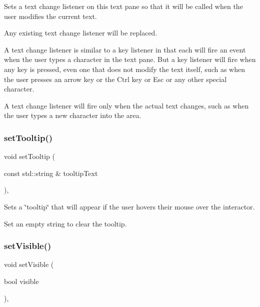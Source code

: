 Sets a text change listener on this text pane so that it will be called when the user modifies the current text. 

Any existing text change listener will be replaced.

A text change listener is similar to a key listener in that each will fire an event when the user types a character in the text pane. But a key listener will fire when any key is pressed, even one that does not modify the text itself, such as when the user presses an arrow key or the Ctrl key or Esc or any other special character.

A text change listener will fire only when the actual text changes, such as when the user types a new character into the area. \mbox{\label{classGInteractor_a039e0e49beaecc275efce02d416acea8}} 
\subsubsection{\texorpdfstring{set\+Tooltip()}{setTooltip()}}
{\footnotesize\ttfamily void set\+Tooltip (\begin{DoxyParamCaption}\item[{const std\+::string \&}]{tooltip\+Text }\end{DoxyParamCaption})\hspace{0.3cm}{\ttfamily [virtual]}, {\ttfamily [inherited]}}



Sets a \char`\"{}tooltip\char`\"{} that will appear if the user hovers their mouse over the interactor. 

Set an empty string to clear the tooltip. \mbox{\label{classGInteractor_a18e44e30b31525a243960ca3928125aa}} 
\subsubsection{\texorpdfstring{set\+Visible()}{setVisible()}}
{\footnotesize\ttfamily void set\+Visible (\begin{DoxyParamCaption}\item[{bool}]{visible }\end{DoxyParamCaption})\hspace{0.3cm}{\ttfamily [virtual]}, {\ttfamily [inherited]}}



